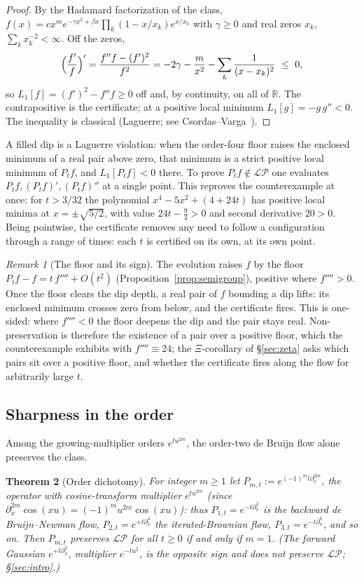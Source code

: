 \documentclass[11pt,reqno]{amsart}
\theoremstyle{plain}
\newtheorem{theorem}{Theorem}[section]
\theoremstyle{definition}
\theoremstyle{remark}
\newtheorem{remark}[theorem]{Remark}
\newcommand{\R}{\mathbb R}
\newcommand{\LP}{\mathcal{LP}}
\begin{document}
\begin{proof}
By the Hadamard factorization of the class,
$f(x)=cx^m e^{-\gamma x^2+\beta x}\prod_k(1-x/x_k)e^{x/x_k}$ with $\gamma\ge0$
and real zeros $x_k$, $\sum_k x_k^{-2}<\infty$. Off the zeros,
\[
   \Bigl(\frac{f'}{f}\Bigr)'=\frac{f''f-(f')^2}{f^2}
   =-2\gamma-\frac{m}{x^2}-\sum_k\frac1{(x-x_k)^2}\ \le\ 0,
\]
so $L_1[f]=(f')^2-f''f\ge0$ off and, by continuity, on all of $\R$. The
contrapositive is the certificate; at a positive local minimum
$L_1[g]=-g\,g''<0$. The inequality is classical
(Laguerre; see Csordas--Varga~\cite{CsordasVarga}).
\end{proof}

A filled dip is a Laguerre violation: when the order-four floor raises the
enclosed minimum of a real pair above zero, that minimum is a strict positive
local minimum of $P_tf$, and $L_1[P_tf]<0$ there. To prove
$P_tf\notin\LP$ one evaluates $P_tf,(P_tf)',(P_tf)''$ at a single point. This
reproves the counterexample at once: for $t>3/32$ the polynomial $x^4-5x^2+(4+24t)$
has positive local minima at $x=\pm\sqrt{5/2}$, with value $24t-\tfrac94>0$ and
second derivative $20>0$. Being pointwise, the certificate removes any need to follow
a configuration through a range of times: each $t$ is certified on its
own, at its own point.

\begin{remark}[The floor and its sign]\label{rem:floor}
The evolution raises $f$ by the floor $P_tf-f=t\,f''''+O(t^2)$
(Proposition~\ref{prop:semigroup}), positive where $f''''>0$. Once the floor clears the dip depth, a real pair of
$f$ bounding a dip lifts: its enclosed minimum crosses zero from below, and
the certificate fires. This is one-sided: where $f''''<0$ the floor deepens the
dip and the pair stays real.
Non-preservation is therefore the existence of a pair over a positive
floor, which the counterexample exhibits with $f''''\equiv24$; the $\Xi$-corollary of
\S\ref{sec:zeta} asks which pairs sit over a positive floor, and whether the
certificate fires along the flow for arbitrarily large $t$.
\end{remark}

\subsection{Sharpness in the order}
Among the growing-multiplier orders $e^{tu^{2m}}$, the order-two de Bruijn flow
alone preserves the class.

\begin{theorem}[Order dichotomy]\label{thm:order}
For integer $m\ge1$ let $P_{m,t}:=e^{(-1)^m t\partial_x^{2m}}$, the operator with
cosine-transform multiplier $e^{tu^{2m}}$ (since $\partial_x^{2m}\cos(xu)=(-1)^m
u^{2m}\cos(xu)$): thus $P_{1,t}=e^{-t\partial_x^2}$ is the backward de
Bruijn--Newman flow, $P_{2,t}=e^{+t\partial_x^4}$ the iterated-Brownian flow,
$P_{3,t}=e^{-t\partial_x^6}$, and so on. Then $P_{m,t}$ preserves $\LP$ for all
$t\ge0$ if and only if $m=1$. (The forward Gaussian $e^{+t\partial_x^2}$,
multiplier $e^{-tu^2}$, is the opposite sign and does not preserve $\LP$;
\S\ref{sec:intro}.)
\end{theorem}
\end{document}
